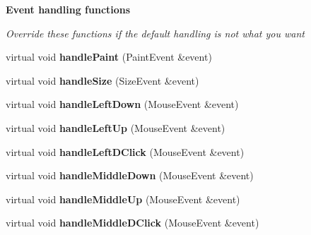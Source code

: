 \begin{Indent}{\bf Event handling functions}\par
{\em Override these functions if the default handling is not what you want }\begin{DoxyCompactItemize}
\item 
virtual void {\bfseries handle\+Paint} (Paint\+Event \&event)\hypertarget{class_view_1_1_robot_world_canvas_a77d292863075ab2e7a51148c86e794b5}{}\label{class_view_1_1_robot_world_canvas_a77d292863075ab2e7a51148c86e794b5}

\item 
virtual void {\bfseries handle\+Size} (Size\+Event \&event)\hypertarget{class_view_1_1_robot_world_canvas_a9e87fc8cfc5d45de10c5b44bdcf32974}{}\label{class_view_1_1_robot_world_canvas_a9e87fc8cfc5d45de10c5b44bdcf32974}

\item 
virtual void {\bfseries handle\+Left\+Down} (Mouse\+Event \&event)\hypertarget{class_view_1_1_robot_world_canvas_a6f01a640b1d11b8a5c399ec1beb5d9dd}{}\label{class_view_1_1_robot_world_canvas_a6f01a640b1d11b8a5c399ec1beb5d9dd}

\item 
virtual void {\bfseries handle\+Left\+Up} (Mouse\+Event \&event)\hypertarget{class_view_1_1_robot_world_canvas_a652bd5372da5fd21ecc2379faf7d5c62}{}\label{class_view_1_1_robot_world_canvas_a652bd5372da5fd21ecc2379faf7d5c62}

\item 
virtual void {\bfseries handle\+Left\+D\+Click} (Mouse\+Event \&event)\hypertarget{class_view_1_1_robot_world_canvas_a6287e395342c737724bebbeb56de826d}{}\label{class_view_1_1_robot_world_canvas_a6287e395342c737724bebbeb56de826d}

\item 
virtual void {\bfseries handle\+Middle\+Down} (Mouse\+Event \&event)\hypertarget{class_view_1_1_robot_world_canvas_af4e64974c6b76b7fa3107694d2a895b8}{}\label{class_view_1_1_robot_world_canvas_af4e64974c6b76b7fa3107694d2a895b8}

\item 
virtual void {\bfseries handle\+Middle\+Up} (Mouse\+Event \&event)\hypertarget{class_view_1_1_robot_world_canvas_a23f3eb4db9fd3b72872f3f8e74425816}{}\label{class_view_1_1_robot_world_canvas_a23f3eb4db9fd3b72872f3f8e74425816}

\item 
virtual void {\bfseries handle\+Middle\+D\+Click} (Mouse\+Event \&event)\hypertarget{class_view_1_1_robot_world_canvas_a1509cf3de672c05fac25b9a63dbd719a}{}\label{class_view_1_1_robot_world_canvas_a1509cf3de672c05fac25b9a63dbd719a}


\end{DoxyCompactItemize}
\end{Indent}

